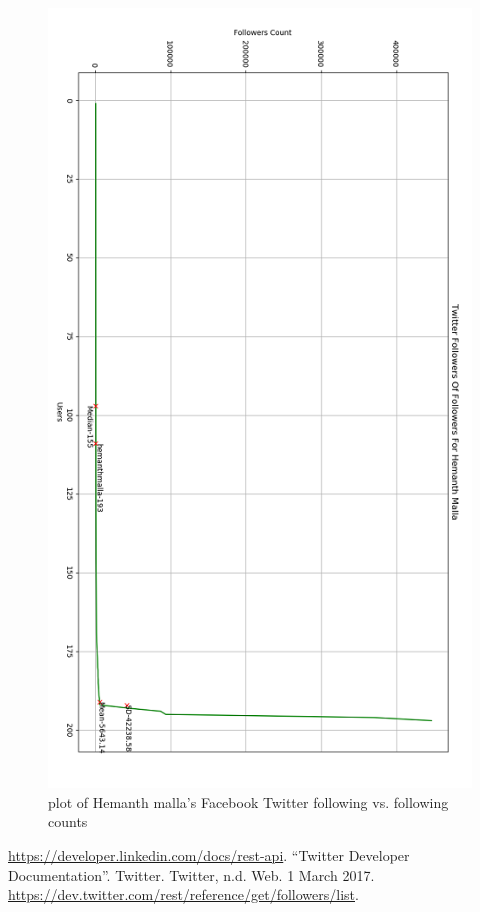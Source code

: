 \documentclass[letterpaper,11pt]{article}
\begin{document}
\begin{figure}[h]
\centering
\includegraphics[scale=1.0]{twitterFollowersParadox.png}
\caption{ plot of Hemanth malla's Facebook Twitter following vs. following counts}
\label{fig:scatterplot}
\end{figure}
\clearpage

\begin{thebibliography}{9}

 \url{https://developer.linkedin.com/docs/rest-api}.
``Twitter Developer Documentation''. Twitter. Twitter, n.d. Web. 1 March 2017. \url{https://dev.twitter.com/rest/reference/get/followers/list}.
\end{thebibliography}
\end{document}
